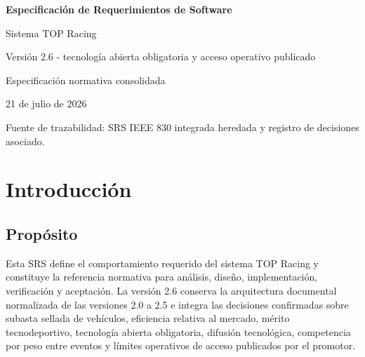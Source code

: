 \documentclass[10pt,letterpaper]{article}
\begin{document}
\begin{titlepage}
\centering
\vspace*{2.2cm}
{\Huge\bfseries Especificación de Requerimientos de Software\par}
\vspace{0.5cm}
{\LARGE Sistema TOP Racing\par}
\vspace{1.1cm}
{\Large Versión 2.6 - tecnología abierta obligatoria y acceso operativo publicado\par}
\vspace{0.4cm}
{\large Especificación normativa consolidada\par}
\vfill
{\large 21 de julio de 2026\par}
\vspace{0.4cm}
{\small Fuente de trazabilidad: SRS IEEE 830 integrada heredada y registro de decisiones asociado.\par}
\end{titlepage}
\tableofcontents
\clearpage
{}

\section{Introducción}
\subsection{Propósito}
Esta SRS define el comportamiento requerido del sistema TOP Racing y constituye la referencia normativa para análisis, diseño, implementación, verificación y aceptación. La versión 2.6 conserva la arquitectura documental normalizada de las versiones 2.0 a 2.5 e integra las decisiones confirmadas sobre subasta sellada de vehículos, eficiencia relativa al mercado, mérito tecnodeportivo, tecnología abierta obligatoria, difusión tecnológica, competencia por peso entre eventos y límites operativos de acceso publicados por el promotor.
\end{document}
